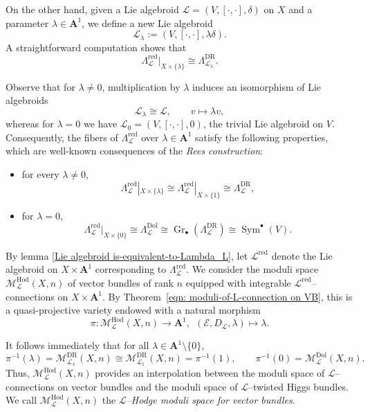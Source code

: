 \documentclass[12pt,reqno]{amsart}
\numberwithin{equation}{subsection}
\theoremstyle{definition}
\theoremstyle{theorem}
\begin{document}
On the other hand, given a Lie algebroid
$\mathcal{L} = (V,[\cdot,\cdot],\delta)$ on $X$ and a parameter
$\lambda \in \mathbf{A}^{1}$, we define a new Lie algebroid
\[
\mathcal{L}_{\lambda} := (V,[\cdot,\cdot],\lambda\delta).
\]
A straightforward computation shows that
\[
\Lambda^{\mathrm{red}}_{\mathcal{L}}|_{X\times\{\lambda\}}
\cong \Lambda^{\text{DR}}_{\mathcal{L}_{\lambda}}.
\]

Observe that for $\lambda \neq 0$, multiplication by $\lambda$ induces
an isomorphism of Lie algebroids
\[
\mathcal{L}_{\lambda} \cong \mathcal{L},
\qquad v \longmapsto \lambda v,
\]
whereas for $\lambda = 0$ we have
$\mathcal{L}_{0} = (V,[\cdot,\cdot],0)$, the trivial Lie algebroid on $V$.
Consequently, the fibers of $\Lambda^{\mathrm{red}}_{\mathcal{L}}$
over $\lambda \in \mathbf{A}^{1}$ satisfy the following properties,
which are well-known consequences of the \emph{Rees construction}:
\begin{itemize}
	\item for every $\lambda \neq 0$,
	\[
	\Lambda^{\mathrm{red}}_{\mathcal{L}}|_{X\times\{\lambda\}}
	\cong \Lambda^{\mathrm{red}}_{\mathcal{L}}|_{X\times\{1\}}
	\cong \Lambda^{\text{DR}}_{\mathcal{L}},
	\]
	\item for $\lambda = 0$,
	\[
	\Lambda^{\mathrm{red}}_{\mathcal{L}}|_{X\times\{0\}}
	\cong \Lambda^{\mathrm{Dol}}_{\mathcal{L}}
	\cong \operatorname{Gr}_{\bullet}(\Lambda^{\text{DR}}_{\mathcal{L}})
	\cong \operatorname{Sym}^{\bullet}(V).
	\]
\end{itemize}

By lemma \eqref{Lie algebroid is-equivalent-to-Lambda_L}, let
$\mathcal{L}^{\mathrm{red}}$ denote the Lie algebroid on
$X \times \mathbf{A}^{1}$ corresponding to
$\Lambda^{\mathrm{red}}_{\mathcal{L}}$.
We consider the moduli space
$\mathcal{M}^{\mathrm{Hod}}_{\mathcal{L}}(X,n)$
of vector bundles of rank $n$ equipped with integrable
$\mathcal{L}^{\mathrm{red}}$--connections on $X \times \mathbf{A}^{1}$.
By Theorem~\eqref{eqn: moduli-of-L-connection on VB}, this is a
quasi-projective variety endowed with a natural morphism
\[
\pi : \mathcal{M}^{\mathrm{Hod}}_{\mathcal{L}}(X,n)
\longrightarrow \mathbf{A}^{1}, \ \
(\mathcal{E},D_{\mathcal{L}},\lambda)\mapsto \lambda.
\]

It follows immediately that for all $\lambda \in \mathbf{A}^{1}\setminus\{0\}$,
\[
\pi^{-1}(\lambda)
= \mathcal{M}^{\text{DR}}_{\mathcal{L}_{\lambda}}(X,n)
\cong \mathcal{M}^{\text{DR}}_{\mathcal{L}_{1}}(X,n)
= \pi^{-1}(1),
\qquad
\pi^{-1}(0)
= \mathcal{M}^{\mathrm{Dol}}_{\mathcal{L}}(X,n).
\]
Thus, $\mathcal{M}^{\mathrm{Hod}}_{\mathcal{L}}(X,n)$
provides an interpolation between the moduli space of
$\mathcal{L}$--connections on vector bundles and the moduli space
of $\mathcal{L}$--twisted Higgs bundles.
We call $\mathcal{M}^{\mathrm{Hod}}_{\mathcal{L}}(X,n)$ the
\emph{$\mathcal{L}$--Hodge moduli space for vector bundles}.
\end{document}
